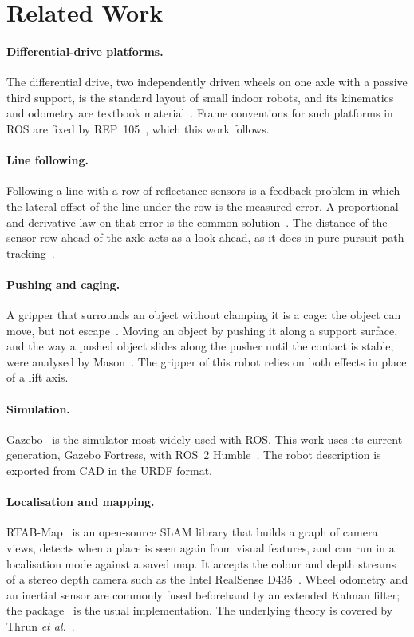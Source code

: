 \section{Related Work}
\label{sec:related}

\paragraph{Differential-drive platforms.} The differential drive, two independently driven
wheels on one axle with a passive third support, is the standard layout of small indoor
robots, and its kinematics and odometry are textbook material~\cite{siegwart}. Frame
conventions for such platforms in ROS are fixed by REP~105~\cite{rep105}, which this work
follows.

\paragraph{Line following.} Following a line with a row of reflectance sensors is a feedback
problem in which the lateral offset of the line under the row is the measured error. A
proportional and derivative law on that error is the common solution~\cite{astrom}. The
distance of the sensor row ahead of the axle acts as a look-ahead, as it does in pure
pursuit path tracking~\cite{purepursuit}.

\paragraph{Pushing and caging.} A gripper that surrounds an object without clamping it is
a cage: the object can move, but not escape~\cite{caging}. Moving an object by pushing it
along a support surface, and the way a pushed object slides along the pusher until the
contact is stable, were analysed by Mason~\cite{mason}. The gripper of this robot relies on
both effects in place of a lift axis.

\paragraph{Simulation.} Gazebo~\cite{gazebo} is the simulator most widely used with ROS.
This work uses its current generation, Gazebo Fortress, with ROS~2
Humble~\cite{ros2}. The robot description is exported from CAD in the URDF format.

\paragraph{Localisation and mapping.} RTAB-Map~\cite{rtabmap} is an open-source SLAM
library that builds a graph of camera views, detects when a place is seen again from visual
features, and can run in a localisation mode against a saved map. It accepts the colour and
depth streams of a stereo depth camera such as the Intel RealSense D435~\cite{realsense}.
Wheel odometry and an inertial sensor are commonly fused beforehand by an extended Kalman
filter; the  package~\cite{robotlocalization} is the usual
implementation. The underlying theory is covered by Thrun \emph{et al.}~\cite{thrun}.

